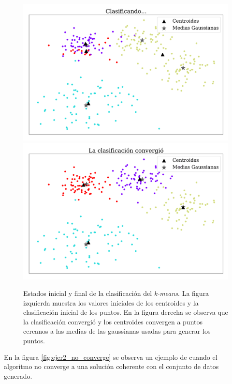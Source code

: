     \begin{figure}[H]
        \centering
        \includegraphics[width=0.495\linewidth]{plots/ejer_2_clasificando_a_conv.pdf}
        \includegraphics[width=0.495\linewidth]{plots/ejer_2_si_converge.pdf}%
        \hfill
        \caption{Estados inicial y final de la clasificación  del \emph{k-means}. La figura izquierda muestra los valores iniciales de los centroides y la clasificación inicial de los puntos. En la figura derecha se observa que la clasificación convergió y los centroides convergen a puntos cercanos a las medias de las gaussianas  usadas para generar los puntos.}
        \label{fig:ejer2_converge}
    \end{figure}

    En la figura \ref{fig:ejer2_no_converge} se observa un ejemplo de cuando el algoritmo no converge a una solución coherente con el conjunto de datos generado. %

